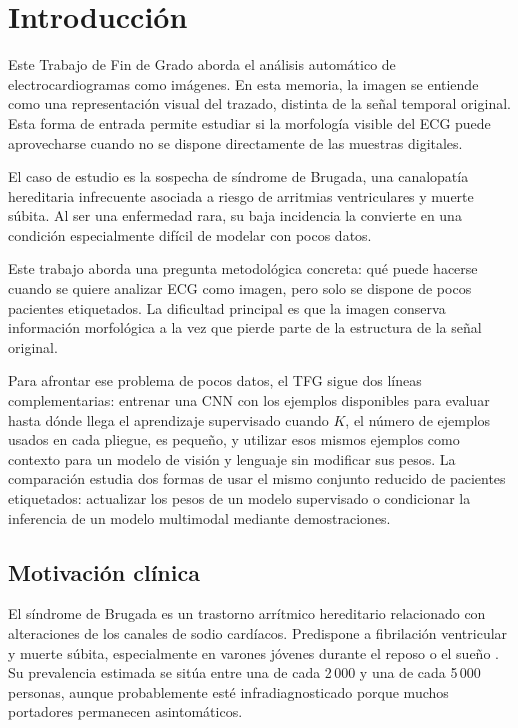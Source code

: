 \chapter{Introducción}
\label{chap:introduccion}

Este Trabajo de Fin de Grado aborda el análisis automático de electrocardiogramas como imágenes. En esta memoria, la imagen se entiende como una representación visual del trazado, distinta de la señal temporal original. Esta forma de entrada permite estudiar si la morfología visible del ECG puede aprovecharse cuando no se dispone directamente de las muestras digitales.

El caso de estudio es la sospecha de síndrome de Brugada, una canalopatía hereditaria infrecuente asociada a riesgo de arritmias ventriculares y muerte súbita. Al ser una enfermedad rara, su baja incidencia la convierte en una condición especialmente difícil de modelar con pocos datos.

Este trabajo aborda una pregunta metodológica concreta: qué puede hacerse cuando se quiere analizar ECG como imagen, pero solo se dispone de pocos pacientes etiquetados. La dificultad principal es que la imagen conserva información morfológica a la vez que pierde parte de la estructura de la señal original.

Para afrontar ese problema de pocos datos, el TFG sigue dos líneas complementarias: entrenar una CNN con los ejemplos disponibles para evaluar hasta dónde llega el aprendizaje supervisado cuando \(K\), el número de ejemplos usados en cada pliegue, es pequeño, y utilizar esos mismos ejemplos como contexto para un modelo de visión y lenguaje sin modificar sus pesos. La comparación estudia dos formas de usar el mismo conjunto reducido de pacientes etiquetados: actualizar los pesos de un modelo supervisado o condicionar la inferencia de un modelo multimodal mediante demostraciones.

\section{Motivación clínica}

El síndrome de Brugada es un trastorno arrítmico hereditario relacionado con alteraciones de los canales de sodio cardíacos. Predispone a fibrilación ventricular y muerte súbita, especialmente en varones jóvenes durante el reposo o el sueño \cite{zeppenfeld2022,wilde2023scbt}. Su prevalencia estimada se sitúa entre una de cada 2\,000 y una de cada 5\,000 personas, aunque probablemente esté infradiagnosticado porque muchos portadores permanecen asintomáticos.

